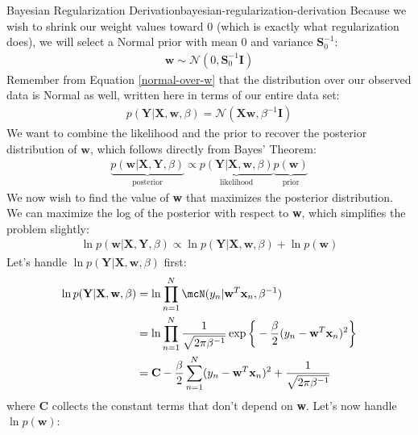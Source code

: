 \begin{derivation}{Bayesian Regularization Derivation}{bayesian-regularization-derivation}
    Because we wish to shrink our weight values toward 0 (which is exactly what regularization does), we will select a Normal prior with mean 0 and variance $\boldsymbol{S}_{0}^{-1}$:
    \begin{align*}
        \textbf{w} \sim \mathcal{N}(0, \boldsymbol{S}_{0}^{-1}\textbf{I})
    \end{align*}
    Remember from Equation \ref{normal-over-w} that the distribution over our observed data is Normal as well, written here in terms of our entire data set:
    \begin{align*}
        p(\textbf{Y} | \textbf{X}, \textbf{w}, \beta) = \mathcal{N}(\textbf{X}\textbf{w}, \beta^{-1}\textbf{I})
    \end{align*}
    We want to combine the likelihood and the prior to recover the posterior distribution of $\textbf{w}$, which follows directly from Bayes' Theorem:
    \begin{align*}
        \underbrace{p(\textbf{w}|\textbf{X},\textbf{Y}, \beta)}_{\text{posterior}} \propto \underbrace{p(\textbf{Y}| \textbf{X}, \textbf{w}, \beta)}_{\text{likelihood}}\underbrace{p(\textbf{w})}_{\text{prior}}
    \end{align*}
    We now wish to find the value of \textbf{w} that maximizes the posterior distribution. We can maximize the log of the posterior with respect to \textbf{w}, which simplifies the problem slightly:
    \begin{align*}
        \ln{p(\textbf{w}|\textbf{X},\textbf{Y}, \beta)} \propto \ln{p(\textbf{Y}| \textbf{X}, \textbf{w}, \beta)} + \ln{p(\textbf{w})}
    \end{align*}
    Let's handle $\ln{p(\textbf{Y}| \textbf{X}, \textbf{w}, \beta)}$ first:
    \begin{align*}
        \ln{p(\textbf{Y}| \textbf{X}, \textbf{w}, \beta)} &= \ln{\prod_{n=1}^{N} \mcN(y_{n} | \textbf{w}^{T} \textbf{x}_{n}, \beta^{-1})} \\
        &= \ln{\prod_{n=1}^{N} \frac{1}{\sqrt{2\pi\beta^{-1}}} \exp{\bigg\{-\frac{\beta}{2}(y_{n} - \textbf{w}^{T} \textbf{x}_{n})^2\bigg\}}} \\
        &= \textbf{C} -\frac{\beta}{2}\sum_{n=1}^{N} (y_{n} - \textbf{w}^{T} \textbf{x}_{n})^2 + \frac{1}{\sqrt{2\pi\beta^{-1}}}
    \end{align*}
    where \textbf{C} collects the constant terms that don't depend on \textbf{w}. Let's now handle $\ln{p(\textbf{w})}$:

\end{derivation}
